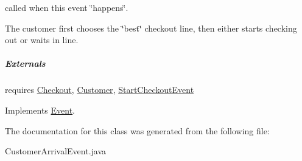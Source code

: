 called when this event \char`\"{}happens\char`\"{}. 

The customer first chooses the \char`\"{}best\char`\"{} checkout line, then either starts checking out or waits in line.

\subparagraph*{Externals}

requires \hyperlink{class_checkout}{Checkout}, \hyperlink{class_customer}{Customer}, \hyperlink{class_start_checkout_event}{StartCheckoutEvent} 

Implements \hyperlink{class_event_fea360b9a95713e43cf3f9fa44150074}{Event}.

The documentation for this class was generated from the following file:\begin{CompactItemize}
\item 
CustomerArrivalEvent.java\end{CompactItemize}
